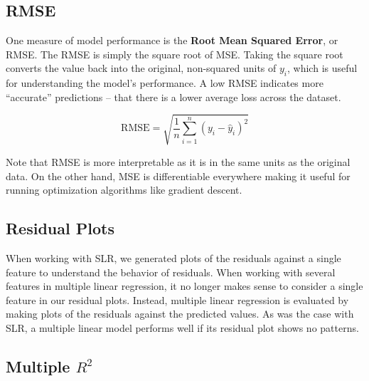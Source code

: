 \documentclass[
  letterpaper,
  DIV=11,
  numbers=noendperiod]{scrreprt}
\begin{document}
\subsection{RMSE}\label{rmse}

One measure of model performance is the \textbf{Root Mean Squared
Error}, or RMSE. The RMSE is simply the square root of MSE. Taking the
square root converts the value back into the original, non-squared units
of \(y_i\), which is useful for understanding the model's performance. A
low RMSE indicates more ``accurate'' predictions -- that there is a
lower average loss across the dataset.

\[\text{RMSE} = \sqrt{\frac{1}{n} \sum_{i=1}^n (y_i - \hat{y}_i)^2}\]

\begin{tcolorbox}[enhanced jigsaw, titlerule=0mm, bottomtitle=1mm, arc=.35mm, colframe=quarto-callout-note-color-frame, rightrule=.15mm, opacityback=0, opacitybacktitle=0.6, leftrule=.75mm, breakable, toprule=.15mm, colback=white, left=2mm, colbacktitle=quarto-callout-note-color!10!white, toptitle=1mm, bottomrule=.15mm, title=\textcolor{quarto-callout-note-color}{\faInfo}\hspace{0.5em}{Note}, coltitle=black]

Note that RMSE is more interpretable as it is in the same units as the
original data. On the other hand, MSE is differentiable everywhere
making it useful for running optimization algorithms like gradient
descent.

\end{tcolorbox}

\subsection{Residual Plots}\label{residual-plots}

When working with SLR, we generated plots of the residuals against a
single feature to understand the behavior of residuals. When working
with several features in multiple linear regression, it no longer makes
sense to consider a single feature in our residual plots. Instead,
multiple linear regression is evaluated by making plots of the residuals
against the predicted values. As was the case with SLR, a multiple
linear model performs well if its residual plot shows no patterns.

\subsection{\texorpdfstring{Multiple
\(R^2\)}{Multiple R\^{}2}}\label{multiple-r2}
\end{document}
